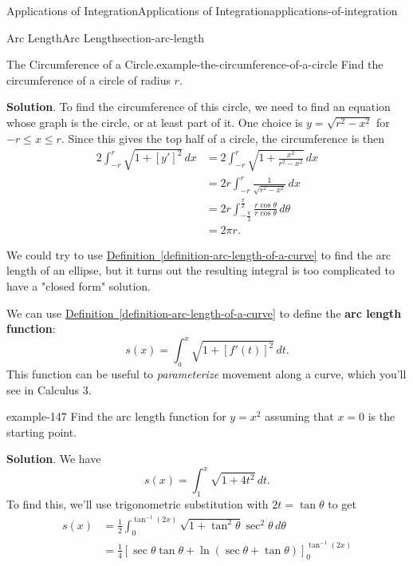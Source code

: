 \documentclass[oneside,10pt,]{book}
\newcommand{\terminology}[1]{\textbf{#1}}
\numberwithin{equation}{section}
\newcommand{\amp}{&}
\begin{document}
\begin{chapterptx}{Applications of Integration}{}{Applications of Integration}{}{}{applications-of-integration}
\begin{sectionptx}{Arc Length}{}{Arc Length}{}{}{section-arc-length}
\begin{example}{The Circumference of a Circle.}{example-the-circumference-of-a-circle}
\hypertarget{p-655}{}%
Find the circumference of a circle of radius \(r\).%
\par\smallskip%
\noindent\textbf{Solution}.\hypertarget{solution-142}{}\quad%
\hypertarget{p-656}{}%
To find the circumference of this circle, we need to find an equation whose graph is the circle, or at least part of it. One choice is \(y = \sqrt{r^{2} - x^{2}}\) for \(-r\leq x\leq r\). Since this gives the top half of a circle, the circumference is then%
\begin{align*}
2\int_{-r}^{r}\sqrt{1 + [y']^{2}}\,dx \amp = 2\int_{-r}^{r}\sqrt{1 + \frac{x^{2}}{r^{2} - x^{2}}}\,dx \\
\amp = 2r\int_{-r}^{r}\frac{1}{\sqrt{r^{2} - x^{2}}}\,dx \\
\amp = 2r\int_{-\frac{\pi}{2}}^{\frac{\pi}{2}}\frac{r\cos\theta}{r\cos\theta}\,d\theta \\
\amp = 2\pi r. 
\end{align*}
%
\end{example}
\hypertarget{p-657}{}%
We could try to use \hyperref[definition-arc-length-of-a-curve]{Definition~\ref{definition-arc-length-of-a-curve}} to find the arc length of an ellipse, but it turns out the resulting integral is too complicated to have a "closed form" solution.%
\par
\hypertarget{p-658}{}%
We can use \hyperref[definition-arc-length-of-a-curve]{Definition~\ref{definition-arc-length-of-a-curve}} to define the \terminology{arc length function}:%
\begin{equation*}
s(x) = \int_{a}^{x}\sqrt{1 + [f'(t)]^{2}}\,dt.
\end{equation*}
This function can be useful to \emph{parameterize} movement along a curve, which you'll see in Calculus 3.%
\begin{example}{}{example-147}%
\hypertarget{p-659}{}%
Find the arc length function for \(y = x^{2}\) assuming that \(x = 0\) is the starting point.%
\par\smallskip%
\noindent\textbf{Solution}.\hypertarget{solution-143}{}\quad%
\hypertarget{p-660}{}%
We have%
\begin{equation*}
s(x) = \int_{1}^{x}\sqrt{1 + 4t^{2}}\,dt.
\end{equation*}
To find this, we'll use trigonometric substitution with \(2t = \tan\theta\) to get%
\begin{align*}
s(x) \amp = \frac{1}{2}\int_{0}^{\tan^{-1}(2x)}\sqrt{1 + \tan^{2}\theta}\sec^{2}\theta\,d\theta \\
\amp = \frac{1}{4}\left[\sec\theta\tan\theta + \ln(\sec\theta + \tan\theta)\right]_{0}^{\tan^{-1}(2x)} \\

\end{align*}
\end{example}
\end{sectionptx}
\end{chapterptx}
\end{document}
